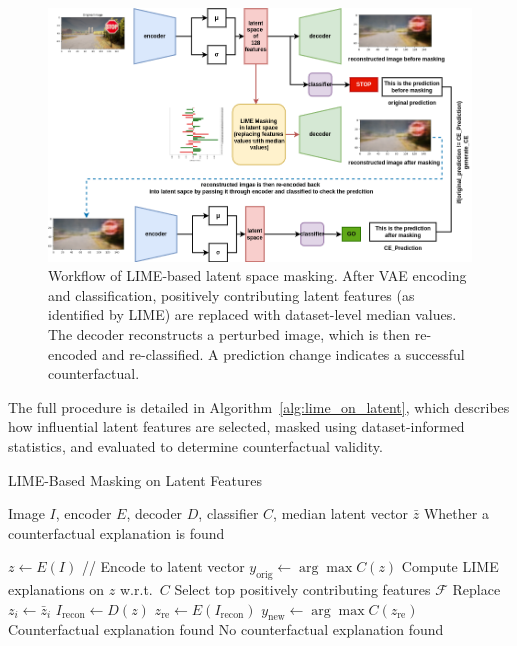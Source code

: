 \begin{figure}[h]
    \centering
    \includegraphics[width=0.95\linewidth]{img//masking/lime_on_latent/LIME_on_latent_space_masking.png}
    \caption[Workflow of LIME-based latent feature masking]{%
Workflow of LIME-based latent space masking. After VAE encoding and classification, positively contributing latent features (as identified by LIME) are replaced with dataset-level median values. The decoder reconstructs a perturbed image, which is then re-encoded and re-classified. A prediction change indicates a successful counterfactual.}
    \label{fig:lime_latent_workflow}
\end{figure}

The full procedure is detailed in Algorithm~\ref{alg:lime_on_latent}, which describes how influential latent features are selected, masked using dataset-informed statistics, and evaluated to determine counterfactual validity.

\vspace{0.5em}
\begin{algorithm}[h]
\caption{LIME-Based Masking on Latent Features}
\label{alg:lime_on_latent}
\begin{algorithmic}[1]
\REQUIRE Image $I$, encoder $E$, decoder $D$, classifier $C$, median latent vector $\bar{z}$
\ENSURE Whether a counterfactual explanation is found

\STATE $z \leftarrow E(I)$ \hfill // Encode to latent vector
\STATE $y_{\text{orig}} \leftarrow \arg\max C(z)$
\STATE Compute LIME explanations on $z$ w.r.t.\ $C$
\STATE Select top positively contributing features \( \mathcal{F} \)
    \STATE Replace $z_i \leftarrow \bar{z}_i$
    \STATE $I_{\text{recon}} \leftarrow D(z)$
    \STATE $z_{\text{re}} \leftarrow E(I_{\text{recon}})$
    \STATE $y_{\text{new}} \leftarrow \arg\max C(z_{\text{re}})$
        \RETURN Counterfactual explanation found
    \ENDIF
\ENDFOR
\RETURN No counterfactual explanation found
\end{algorithmic}
\end{algorithm}

